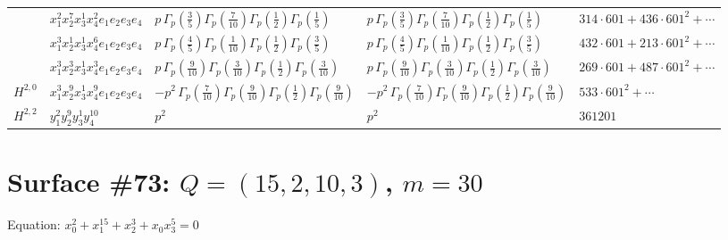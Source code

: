 \documentclass[11pt]{article}
\begin{document}
\begin{table}[ht]
{\begin{tabular}{@{}lllll@{}}
 & $x_{1}^{2} x_{2}^{7} x_{3}^{1} x_{4}^{2}  e_{1} e_{2} e_{3} e_{4}$ & $p \, \Gamma_p \left( \frac{3}{5} \right) \Gamma_p \left( \frac{7}{10} \right) \Gamma_p \left( \frac{1}{2} \right) \Gamma_p \left( \frac{1}{5} \right)$ & $p \, \Gamma_p \left( \frac{3}{5} \right) \Gamma_p \left( \frac{7}{10} \right) \Gamma_p \left( \frac{1}{2} \right) \Gamma_p \left( \frac{1}{5} \right)$ & $314{\cdot}601{+}436{\cdot}601^{2}{+}\cdots$ \\
 & $x_{1}^{3} x_{2}^{1} x_{3}^{1} x_{4}^{6}  e_{1} e_{2} e_{3} e_{4}$ & $p \, \Gamma_p \left( \frac{4}{5} \right) \Gamma_p \left( \frac{1}{10} \right) \Gamma_p \left( \frac{1}{2} \right) \Gamma_p \left( \frac{3}{5} \right)$ & $p \, \Gamma_p \left( \frac{4}{5} \right) \Gamma_p \left( \frac{1}{10} \right) \Gamma_p \left( \frac{1}{2} \right) \Gamma_p \left( \frac{3}{5} \right)$ & $432{\cdot}601{+}213{\cdot}601^{2}{+}\cdots$ \\
 & $x_{1}^{3} x_{2}^{3} x_{3}^{1} x_{4}^{3}  e_{1} e_{2} e_{3} e_{4}$ & $p \, \Gamma_p \left( \frac{9}{10} \right) \Gamma_p \left( \frac{3}{10} \right) \Gamma_p \left( \frac{1}{2} \right) \Gamma_p \left( \frac{3}{10} \right)$ & $p \, \Gamma_p \left( \frac{9}{10} \right) \Gamma_p \left( \frac{3}{10} \right) \Gamma_p \left( \frac{1}{2} \right) \Gamma_p \left( \frac{3}{10} \right)$ & $269{\cdot}601{+}487{\cdot}601^{2}{+}\cdots$ \\
\midrule
$H^{2,0}$ & $x_{1}^{3} x_{2}^{9} x_{3}^{1} x_{4}^{9}  e_{1} e_{2} e_{3} e_{4}$ & $- p^{2} \, \Gamma_p \left( \frac{7}{10} \right) \Gamma_p \left( \frac{9}{10} \right) \Gamma_p \left( \frac{1}{2} \right) \Gamma_p \left( \frac{9}{10} \right)$ & $- p^{2} \, \Gamma_p \left( \frac{7}{10} \right) \Gamma_p \left( \frac{9}{10} \right) \Gamma_p \left( \frac{1}{2} \right) \Gamma_p \left( \frac{9}{10} \right)$ & $533{\cdot}601^{2}{+}\cdots$ \\
\midrule
$H^{2,2}$ & $y_{1}^{2} y_{2}^{9} y_{3}^{1} y_{4}^{10}$ & $p^{2} \,$ & $p^{2} \,$ & $361201$ \\
\bottomrule
\end{tabular}
}
\renewcommand{\arraystretch}{1.0}
\end{table}

\newpage

\section*{Surface \#73: $Q=(15, 2, 10, 3)$, $m=30$}

Equation: $x_0^{2} + x_1^{15} + x_2^{3} + x_0 x_3^{5} = 0$
\end{document}
